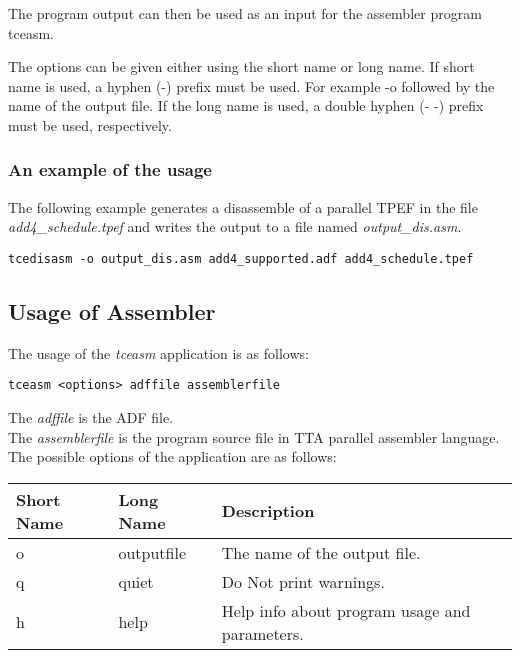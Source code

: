 \documentclass[twoside]{tceusermanual}
\begin{document}
The program output can then be used as an input for the assembler program
tceasm.

The options can be given either using the short name or long name. If
short name is used, a hyphen (-) prefix must be used. For example -o
followed by the name of the output file. If the long name is used, a
double hyphen (- -) prefix must be used, respectively.

\subsubsection{An example of the usage}

The following example generates a disassemble of a parallel TPEF in the file
\emph{add4\_schedule.tpef} and writes the output to a file named
\emph{output\_dis.asm}.
 
\begin{verbatim}
tcedisasm -o output_dis.asm add4_supported.adf add4_schedule.tpef 
\end{verbatim}

\subsection{Usage of Assembler}

The usage of the \emph{tceasm} application is as follows:

\begin{verbatim}
tceasm <options> adffile assemblerfile
\end{verbatim}

The \emph{adffile} is the ADF file.\\
The \emph{assemblerfile} is the program source file in TTA parallel assembler
language.\\

The possible options of the application are as follows:\\

\begin{tabular}{p{}p{}
                p{}}
\textbf{Short Name} &\textbf{Long Name} &\textbf{Description} \\
\hline
o & outputfile  & The name of the output file.\\
q & quiet       & Do Not print warnings.\\
h & help        & Help info about program usage and parameters.\\
\end{tabular}\\
\end{document}
